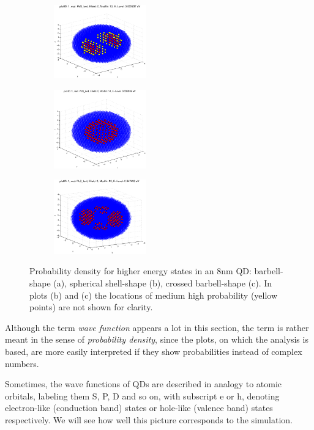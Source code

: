 \begin{figure}
	\centering
	\begin{subfigure}{150px}
		\includegraphics[width=150px]{Fig/Plots/r4CBmod10}
		\caption{}
	\end{subfigure}
	\begin{subfigure}{150px}
		\includegraphics[width=150px]{Fig/Plots/r4CBmod14}
		\caption{}
	\end{subfigure}
	\begin{subfigure}{150px}
		\includegraphics[width=150px]{Fig/Plots/r4CBmod20}
		\caption{}
	\end{subfigure}
	\caption{Probability density for higher energy states in an 8nm QD: barbell-shape (a), spherical shell-shape (b), crossed barbell-shape (c). In plots (b) and (c) the locations of medium high probability (yellow points) are not shown for clarity.}
	\label{fig:HigherModWaveFn}
\end{figure}
%

\begin{REMARK}
Although the term \textit{wave function} appears a lot in this section, the term is rather meant in the sense of \textit{probability density}, since the plots, on which the analysis is based, are more easily interpreted if they show probabilities instead of complex numbers.
\end{REMARK}

Sometimes, the wave functions of QDs are described in analogy to atomic orbitals, labeling them S, P, D and so on, with subscript e or h, denoting electron-like (conduction band) states or hole-like (valence band) states respectively. We will see how well this picture corresponds to the simulation.

